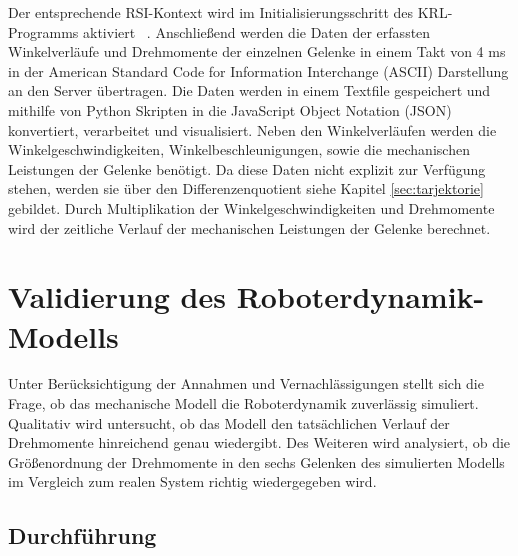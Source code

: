 %
Der entsprechende RSI-Kontext wird im Initialisierungsschritt des KRL-Programms aktiviert ~\cite[S.~50]{RSI.2020}. Anschließend werden die Daten der erfassten Winkelverläufe und Drehmomente der einzelnen Gelenke in einem Takt von 4 ms in der American Standard Code for Information Interchange (ASCII) Darstellung an den Server übertragen. Die Daten werden in einem Textfile gespeichert und mithilfe von Python Skripten in die JavaScript Object Notation (JSON) konvertiert, verarbeitet und visualisiert. 
%
Neben den Winkelverläufen werden die Winkelgeschwindigkeiten, Winkelbeschleunigungen, sowie die mechanischen Leistungen der Gelenke benötigt. Da diese Daten nicht explizit zur Verfügung stehen, werden sie über den Differenzenquotient siehe Kapitel \ref{sec:tarjektorie} gebildet. Durch Multiplikation der Winkelgeschwindigkeiten und Drehmomente wird der zeitliche Verlauf der mechanischen Leistungen der Gelenke berechnet.
%
\section{Validierung des Roboterdynamik-Modells}
Unter Berücksichtigung der Annahmen und Vernachlässigungen stellt sich die Frage, ob das mechanische Modell die Roboterdynamik zuverlässig simuliert. Qualitativ wird untersucht, ob das Modell den tatsächlichen Verlauf der Drehmomente hinreichend genau wiedergibt. Des Weiteren wird analysiert, ob die Größenordnung der Drehmomente in den sechs Gelenken des simulierten Modells im Vergleich zum realen System richtig wiedergegeben wird. 
%
\subsection{Durchführung}

